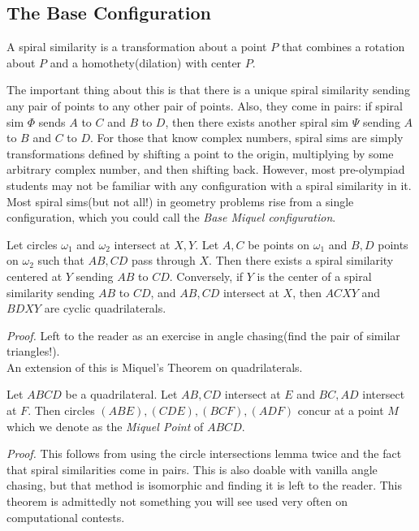 \documentclass[11pt]{article}
\begin{document}
\subsection{The Base Configuration}
\begin{defi}

A spiral similarity is a transformation about a point $P$ that combines a rotation about $P$ and a homothety(dilation) with center $P$. 
\end{defi}
The important thing about this is that there is a unique spiral similarity sending any pair of points to any other pair of points. Also, they come in pairs: if spiral sim $\Phi$ sends $A$ to $C$ and $B$ to $D$, then there exists another spiral sim $\Psi$ sending $A$ to $B$ and $C$ to $D$. For those that know complex numbers, spiral sims are simply transformations defined by shifting a point to the origin, multiplying by some arbitrary complex number, and then shifting back. However, most pre-olympiad students may not be familiar with any configuration with a spiral similarity in it. Most spiral sims(but not all!) in geometry problems rise from a single configuration, which you could call the \textit{Base Miquel configuration}.
\begin{lemma}
Let circles $\omega_1$ and $\omega_2$ intersect at $X,Y$. Let $A,C$ be points on $\omega_1$ and $B,D$ points on $\omega_2$ such that $AB,CD$ pass through $X$. Then there exists a spiral similarity centered at $Y$ sending $AB$ to $CD$. Conversely, if $Y$ is the center of a spiral similarity sending $AB$ to $CD$, and $AB,CD$ intersect at $X$, then $ACXY$ and $BDXY$ are cyclic quadrilaterals.
\end{lemma}
\textit{Proof.} Left to the reader as an exercise in angle chasing(find the pair of similar triangles!).\\
An extension of this is Miquel's Theorem on quadrilaterals.\\
\begin{theo}
Let $ABCD$ be a quadrilateral. Let $AB,CD$ intersect at $E$ and $BC, AD$ intersect at $F$. Then circles $(ABE),(CDE),(BCF),(ADF)$ concur at a point $M$ which we denote as the \textit{Miquel Point} of $ABCD$.
\end{theo}
\textit{Proof.} This follows from using the circle intersections lemma twice and the fact that spiral similarities come in pairs. This is also doable with vanilla angle chasing, but that method is isomorphic and finding it is left to the reader. This theorem is admittedly not something you will see used very often on computational contests.\\
\end{document}
